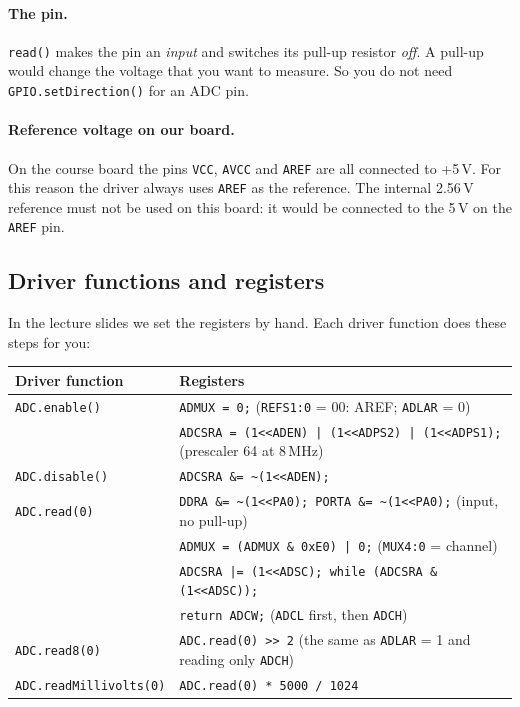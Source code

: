 \documentclass[11pt,a4paper]{article}
\newcommand{\code}[1]{\texttt{#1}}
\begin{document}
\paragraph{The pin.} \code{read()} makes the pin an \emph{input} and switches
its pull-up resistor \emph{off}. A pull-up would change the voltage that you
want to measure. So you do not need \code{GPIO.setDirection()} for an ADC pin.

\paragraph{Reference voltage on our board.} On the course board the pins
\code{VCC}, \code{AVCC} and \code{AREF} are all connected to +5\,V. For this
reason the driver always uses \code{AREF} as the reference. The internal
2.56\,V reference must not be used on this board: it would be connected to the
5\,V on the \code{AREF} pin.

\subsection*{Driver functions and registers}

In the lecture slides we set the registers by hand. Each driver function does
these steps for you:

\begin{center}
\small
{\footnotesize\begin{tabular}{@{}ll@{}}
\toprule
\textbf{Driver function} & \textbf{Registers} \\
\midrule
\code{ADC.enable()} & \code{ADMUX = 0;} \quad (\code{REFS1:0} = 00: AREF; \code{ADLAR} = 0) \\
                   & \code{ADCSRA = (1<{}<ADEN) | (1<{}<ADPS2) | (1<{}<ADPS1);} \quad (prescaler 64 at 8\,MHz) \\
\code{ADC.disable()} & \code{ADCSRA \&= \textasciitilde(1<{}<ADEN);} \\
\code{ADC.read(0)} & \code{DDRA \&= \textasciitilde(1<{}<PA0); PORTA \&= \textasciitilde(1<{}<PA0);} \quad (input, no pull-up) \\
                   & \code{ADMUX = (ADMUX \& 0xE0) | 0;} \quad (\code{MUX4:0} = channel) \\
                   & \code{ADCSRA |= (1<{}<ADSC); while (ADCSRA \& (1<{}<ADSC));} \\
                   & \code{return ADCW;} \quad (\code{ADCL} first, then \code{ADCH}) \\
\code{ADC.read8(0)} & \code{ADC.read(0) >{}> 2} \quad (the same as \code{ADLAR} = 1 and reading only \code{ADCH}) \\
\code{ADC.readMillivolts(0)} & \code{ADC.read(0) * 5000 / 1024} \\
\bottomrule
\end{tabular}}
\end{center}
\end{document}
